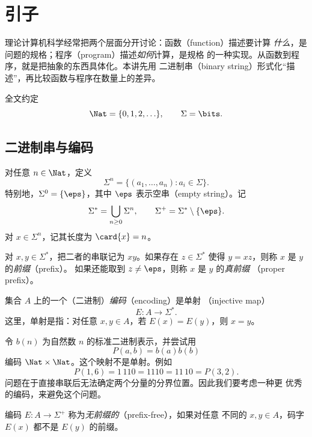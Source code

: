 \chapter{引子}
\label{chap:introduction}

理论计算机科学经常把两个层面分开讨论：函数（function）描述要计算
\emph{什么}，是问题的规格；程序（program）描述\emph{如何}计算，是规格
的一种实现。从函数到程序，就是把抽象的东西具体化。本讲先用
二进制串（binary string）形式化“描述”，再比较函数与程序在数量上的差异。

全文约定
\[
  \Nat=\{0,1,2,\ldots\},\qquad \Sigma=\bits.
\]

\section{二进制串与编码}

\begin{definition}[二进制串]
  \label{def:binary-string}
  对任意 $n\in\Nat$，定义
  \[
    \Sigma^n=\{(a_1,\ldots,a_n):a_i\in\Sigma\}.
  \]
  特别地，$\Sigma^0=\{\eps\}$，其中 $\eps$ 表示空串（empty string）。记
  \[
    \Sigma^*=\bigcup_{n\geq 0}\Sigma^n,
    \qquad
    \Sigma^+=\Sigma^*\setminus\{\eps\}.
  \]
  对 $x\in\Sigma^n$，记其长度为 $\card{x}=n$。

  对 $x,y\in\Sigma^*$，把二者的串联记为 $xy$。如果存在
  $z\in\Sigma^*$ 使得 $y=xz$，则称 $x$ 是 $y$ 的\emph{前缀}（prefix）。
  如果还能取到 $z\neq\eps$，则称 $x$ 是 $y$ 的\emph{真前缀}
  （proper prefix）。
\end{definition}

\begin{definition}[编码]
  \label{def:encoding}
  集合 $A$ 上的一个（二进制）\emph{编码}（encoding）是单射
  （injective map）
  \[
    E:A\longrightarrow\Sigma^*.
  \]
  这里，单射是指：对任意 $x,y\in A$，若 $E(x)=E(y)$，则 $x=y$。
\end{definition}

\begin{example}
  \label{ex:pair-encoding}
  令 $b(n)$ 为自然数 $n$ 的标准二进制表示，并尝试用
  \[
    P(a,b)=b(a)b(b)
  \]
  编码 $\Nat\times\Nat$。这个映射不是单射。例如
  \[
    P(1,6)=1\,110=1110=11\,10=P(3,2).
  \]
  问题在于直接串联后无法确定两个分量的分界位置。因此我们要考虑一种更
  优秀的编码，来避免这个问题。
\end{example}

\begin{definition}[无前缀编码]
  \label{def:prefix-free}
  编码 $E:A\to\Sigma^+$ 称为\emph{无前缀的}（prefix-free），如果对任意
  不同的 $x,y\in A$，码字 $E(x)$ 都不是 $E(y)$ 的前缀。
\end{definition}

